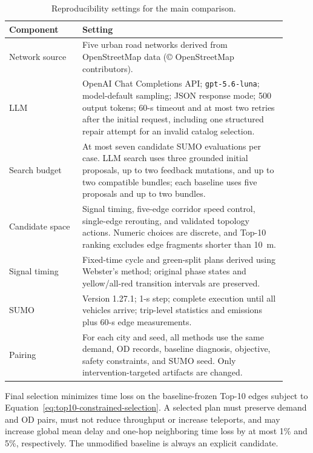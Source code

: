 \documentclass{trbunofficial}
\begin{document}
\begin{table}[!ht]
  \caption{Reproducibility settings for the main comparison.}
  \label{tab:reproducibility-settings}
  \begin{center}
    \begin{tabular}{p{0.24\linewidth}p{0.67\linewidth}}
      \hline
      Component & Setting \\
      \hline
      Network source & Five urban road networks derived from OpenStreetMap
      data (\copyright{} OpenStreetMap contributors). \\
      LLM & OpenAI Chat Completions API; \texttt{gpt-5.6-luna}; model-default
      sampling; JSON response mode; 500 output tokens; 60-s timeout and at most
      two retries after the initial request, including one structured repair
      attempt for an invalid catalog selection. \\
      Search budget & At most seven candidate SUMO evaluations per case. LLM
      search uses three grounded initial proposals, up to two feedback
      mutations, and up to two compatible bundles; each baseline uses five
      proposals and up to two bundles. \\
      Candidate space & Signal timing, five-edge corridor speed control,
      single-edge rerouting, and validated topology actions. Numeric choices
      are discrete, and Top-10 ranking excludes edge fragments shorter than
      10~m. \\
      Signal timing & Fixed-time cycle and green-split plans derived using
      Webster's method; original phase states and yellow/all-red transition
      intervals are preserved. \\
      SUMO & Version 1.27.1; 1-s step; complete execution until all vehicles
      arrive; trip-level statistics and emissions plus 60-s edge measurements. \\
      Pairing & For each city and seed, all methods use the same demand, OD
      records, baseline diagnosis, objective, safety constraints, and SUMO
      seed. Only intervention-targeted artifacts are changed. \\
      \hline
    \end{tabular}
  \end{center}
\end{table}

Final selection minimizes time loss on the baseline-frozen Top-10 edges subject
to Equation~\ref{eq:top10-constrained-selection}.  A selected plan must preserve
demand and OD pairs, must not reduce throughput or increase teleports, and may
increase global mean delay and one-hop neighboring time loss by at most 1\% and
5\%, respectively.  The unmodified baseline is always an explicit candidate.
\end{document}
